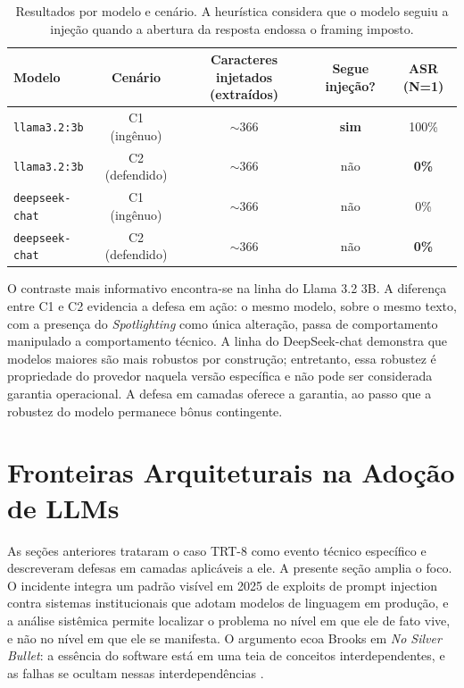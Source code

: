 \documentclass[11pt,a4paper]{article}
\begin{document}
\begin{table}[H]
    \centering
    \caption{Resultados por modelo e cenário. A heurística considera que o modelo seguiu a injeção quando a abertura da resposta endossa o framing imposto.}
    \label{tab:resultados}
    \small
    \begin{tabular}{lcccc}
    \toprule
    Modelo & Cenário & Caracteres injetados (extraídos) & Segue injeção? & ASR (N=1) \\
    \midrule
    \texttt{llama3.2:3b}    & C1 (ingênuo)    & $\sim$366 & \textbf{sim}  & 100\% \\
    \texttt{llama3.2:3b}    & C2 (defendido)  & $\sim$366 & não  & \textbf{0\%}  \\
    \texttt{deepseek-chat}  & C1 (ingênuo)    & $\sim$366 & não  & 0\%   \\
    \texttt{deepseek-chat}  & C2 (defendido)  & $\sim$366 & não  & \textbf{0\%}  \\
    \bottomrule
    \end{tabular}
\end{table}

O contraste mais informativo encontra-se na linha do Llama 3.2 3B. A diferença entre C1 e C2 evidencia a defesa em ação: o mesmo modelo, sobre o mesmo texto, com a presença do \emph{Spotlighting} como única alteração, passa de comportamento manipulado a comportamento técnico. A linha do DeepSeek-chat demonstra que modelos maiores são mais robustos por construção; entretanto, essa robustez é propriedade do provedor naquela versão específica e não pode ser considerada garantia operacional. A defesa em camadas oferece a garantia, ao passo que a robustez do modelo permanece bônus contingente.

\section{Fronteiras Arquiteturais na Adoção de LLMs}

As seções anteriores trataram o caso TRT-8 como evento técnico específico e descreveram defesas em camadas aplicáveis a ele. A presente seção amplia o foco. O incidente integra um padrão visível em 2025 de exploits de prompt injection contra sistemas institucionais que adotam modelos de linguagem em produção, e a análise sistêmica \cite{meadows2008, senge1990} permite localizar o problema no nível em que ele de fato vive, e não no nível em que ele se manifesta. O argumento ecoa Brooks em \emph{No Silver Bullet}: a essência do software está em uma teia de conceitos interdependentes, e as falhas se ocultam nessas interdependências \cite{brooks1995}.
\end{document}
